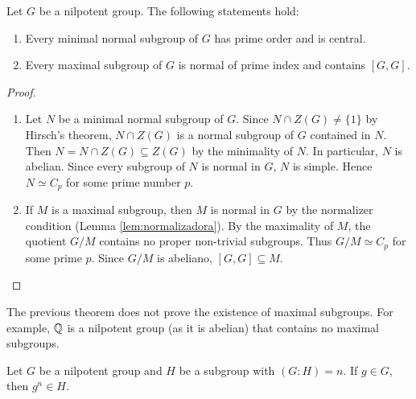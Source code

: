 \begin{theorem}
Let $G$ be a nilpotent group. The following statements hold: 
\begin{enumerate}
\item Every minimal normal subgroup of $G$ has prime order and is central. 
\item Every maximal subgroup of $G$ is normal of prime index and contains $[G,G]$. 
\end{enumerate}
\end{theorem}

\begin{proof}\
\begin{enumerate}
    \item Let $N$ be a minimal normal subgroup of $G$. Since 
        $N\cap Z(G)\ne\{1\}$ by Hirsch's theorem, $N\cap Z(G)$ is a normal subgroup of 
        $G$ contained in $N$. Then $N=N\cap Z(G)\subseteq
	Z(G)$ by the minimality of $N$. In particular, $N$ is abelian. Since every subgroup of 
         $N$ is normal in $G$, $N$ is simple. Hence $N\simeq
	C_p$ for some prime number $p$.
 \item  If $M$ is a maximal subgroup, then $M$
is normal in $G$ by the normalizer condition (Lemma \ref{lem:normalizadora}). By the maximality
of $M$, the quotient $G/M$ contains no proper non-trivial subgroups. Thus 
$G/M\simeq C_p$ for some prime $p$. Since 
	$G/M$ is abeliano, $[G,G]\subseteq M$. \qedhere 
\end{enumerate}
\end{proof}

The previous theorem does not prove the existence of maximal subgroups. For example, 
$\mathbb{Q}$ is a nilpotent group (as it is abelian) 
that contains no maximal subgroups. 

\begin{proposition}
\label{pro:g^n}
Let $G$ be a nilpotent group and $H$ be a subgroup with $(G:H)=n$. If 
$g\in G$, then $g^n\in H$.
\end{proposition}

